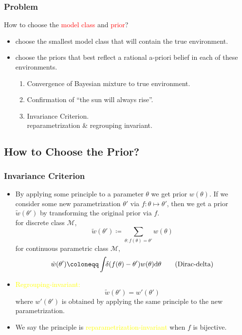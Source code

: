 \documentclass[UTF8,11pt,colorlinks,compress,openany]{beamer}%
\begin{document}
\begin{frame}\frametitle{Problem}
	\begin{block}{How to choose the \textcolor{red}{model class} and \textcolor{red}{prior}?}
		\begin{itemize}
			\item choose the smallest model class that will contain the true environment.
			\item choose the priors that best reflect a rational a-priori belief in each of these environments.
			\begin{enumerate}
				\item Convergence of Bayesian mixture to true environment.
				\item Confirmation of ``the sun will always rise''.
				\item Invariance Criterion.\\
				reparametrization \& regrouping invariant.
			\end{enumerate}
		\end{itemize}
	\end{block}
\end{frame}

\subsection{How to Choose the Prior?}

\begin{frame}\frametitle{Invariance Criterion}
	\begin{itemize}
		\item By applying some principle to a parameter $\theta$ we get prior $w(\theta)$. If we consider some new parametrization $\theta'$ via $f:\theta\mapsto\theta'$, then we get a prior $\tilde{w}(\theta')$ by transforming the original prior via $f$.\\
	for discrete class $\mathcal{M}$,
	\[\tilde{w}(\theta')\coloneqq \sum\limits_{\theta:f(\theta)=\theta'}\!\!\!\!w(\theta)\]
	for continuous parametric class $\mathcal{M}$, 
	\[\tilde{w}(\theta')\coloneqq \int\!\!\delta(f(\theta)-\theta') w(\theta)\mathrm{d}\theta\tag{\text{Dirac-delta}}\]
		\item \textcolor{yellow}{Regrouping-invariant:} $$\tilde{w}(\theta')=w'(\theta')$$ where $w'(\theta')$ is obtained by applying the same principle to the new parametrization.
		\item	We say the principle is \textcolor{yellow}{reparametrization-invariant} when $f$ is bijective.
	\end{itemize}
\end{frame}
\end{document}
